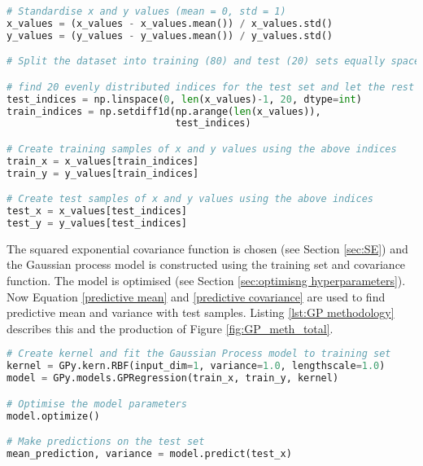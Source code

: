 \documentclass[12pt,a4paper]{article}
\begin{document}
\vspace{20pt}
\begin{lstlisting}[language=python, caption={Code of standardising the x and y values and splitting the values intro training and test samples.}, label={lst:standardisation and splitting}]
# Standardise x and y values (mean = 0, std = 1)
x_values = (x_values - x_values.mean()) / x_values.std()
y_values = (y_values - y_values.mean()) / y_values.std()

# Split the dataset into training (80) and test (20) sets equally spaced across the axis

# find 20 evenly distributed indices for the test set and let the rest be the training set 
test_indices = np.linspace(0, len(x_values)-1, 20, dtype=int)
train_indices = np.setdiff1d(np.arange(len(x_values)),  
                             test_indices)

# Create training samples of x and y values using the above indices
train_x = x_values[train_indices]
train_y = y_values[train_indices]

# Create test samples of x and y values using the above indices
test_x = x_values[test_indices]
test_y = y_values[test_indices]
\end{lstlisting}

The squared exponential covariance function is chosen (see Section \ref{sec:SE}) and the Gaussian process model is constructed using the training set and covariance function. The model is optimised (see Section \ref{sec:optimisng hyperparameters}). Now Equation \eqref{predictive mean} and \eqref{predictive covariance} are used to find predictive mean and variance with test samples. Listing \ref{lst:GP methodology} describes this and the production of Figure \ref{fig:GP_meth_total}.

\vspace{20pt}
\begin{lstlisting}[language=python, caption={Code of the Gaussian Process regression, predictive mean and credible interval calculations.}, label={lst:GP methodology}]
# Create kernel and fit the Gaussian Process model to training set
kernel = GPy.kern.RBF(input_dim=1, variance=1.0, lengthscale=1.0)
model = GPy.models.GPRegression(train_x, train_y, kernel)

# Optimise the model parameters
model.optimize()

# Make predictions on the test set
mean_prediction, variance = model.predict(test_x)
\end{lstlisting}
\end{document}
